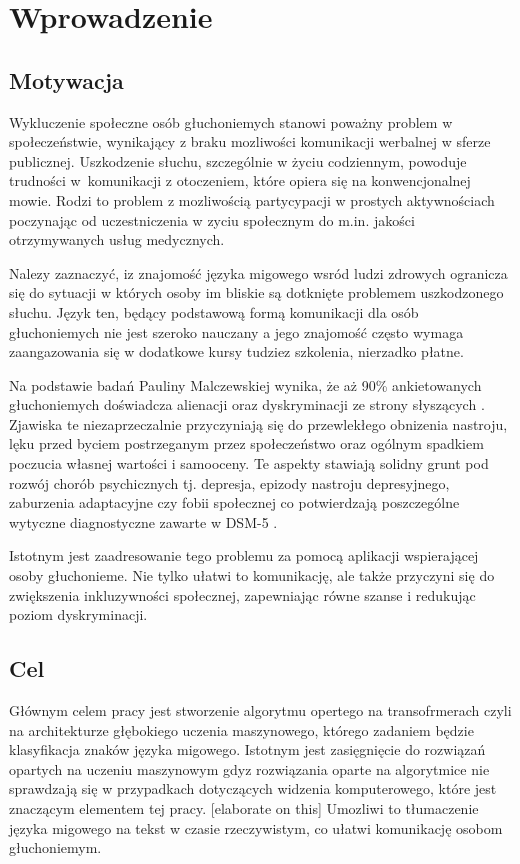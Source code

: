 \chapter{Wprowadzenie}\label{ch:intro}

\section{Motywacja}

Wykluczenie społeczne osób głuchoniemych stanowi poważny problem w społeczeństwie, wynikający z braku mozliwości komunikacji werbalnej w sferze publicznej. 
Uszkodzenie słuchu, szczególnie w życiu codziennym, powoduje trudności w~komunikacji z otoczeniem, które opiera się na konwencjonalnej mowie.
Rodzi to problem z mozliwością partycypacji w prostych aktywnościach poczynając od uczestniczenia w zyciu społecznym do m.in. jakości otrzymywanych usług medycznych.

Nalezy zaznaczyć, iz znajomość języka migowego wsród ludzi zdrowych ogranicza się do sytuacji w których osoby im bliskie są dotknięte problemem uszkodzonego słuchu.  
Język ten, będący podstawową formą komunikacji dla osób głuchoniemych nie jest szeroko nauczany a jego znajomość często wymaga zaangazowania się w dodatkowe kursy tudziez szkolenia, nierzadko płatne.

Na podstawie badań Pauliny Malczewskiej wynika, że aż 90\% ankietowanych głuchoniemych doświadcza alienacji oraz dyskryminacji ze strony słyszących \cite{malczewska2011}.
Zjawiska te niezaprzeczalnie przyczyniają się do przewlekłego obnizenia nastroju, lęku przed byciem postrzeganym przez społeczeństwo oraz ogólnym spadkiem poczucia własnej wartości i samooceny. 
Te aspekty stawiają solidny grunt pod rozwój chorób psychicznych tj. depresja, epizody nastroju depresyjnego, zaburzenia adaptacyjne czy fobii społecznej co potwierdzają poszczególne wytyczne diagnostyczne zawarte w DSM-5 \cite{american2013diagnostic}.

Istotnym jest zaadresowanie tego problemu za pomocą aplikacji wspierającej osoby głuchonieme.
Nie tylko ułatwi to komunikację, ale także przyczyni się do zwiększenia inkluzywności społecznej, zapewniając równe szanse i redukując poziom dyskryminacji.


\section{Cel}\label{sec:aim}

Głównym celem pracy jest stworzenie algorytmu opertego na transofrmerach czyli na architekturze głębokiego uczenia maszynowego, którego zadaniem będzie klasyfikacja znaków języka migowego.
Istotnym jest zasięgnięcie do rozwiązań opartych na uczeniu maszynowym gdyz rozwiązania oparte na algorytmice nie sprawdzają się w przypadkach dotyczących widzenia komputerowego, które jest znaczącym elementem tej pracy. [elaborate on this]
Umozliwi to tłumaczenie języka migowego na tekst w czasie rzeczywistym, co ułatwi komunikację osobom głuchoniemym. 

